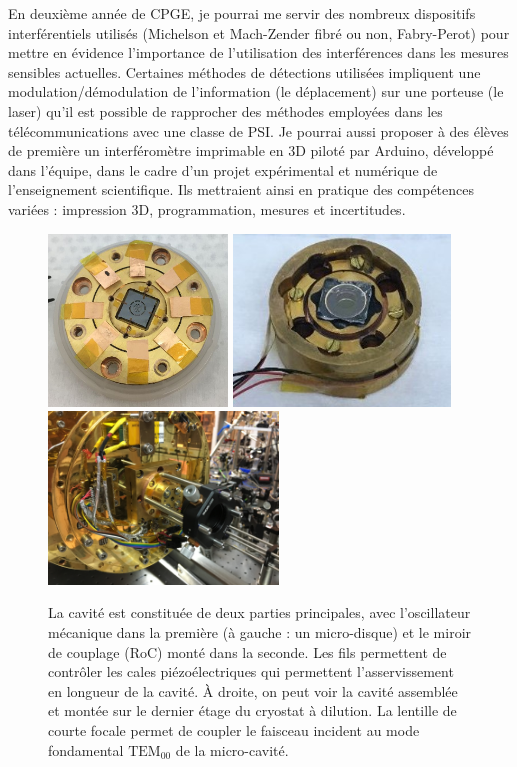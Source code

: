 \documentclass[12pt,a4paper]{article}
\newcommand{\uroc}{\micro RoC}
\newenvironment{mep}{%
\addcontentsline{ldf}{figure}{0}%
\begin{mep_env}
\small}
{\end{mep_env}}
\begin{document}
\begin{mep}
En deuxième année de CPGE, je pourrai me servir des nombreux dispositifs interférentiels utilisés (Michelson et Mach-Zender fibré ou non, Fabry-Perot) pour mettre en évidence l'importance de l'utilisation des interférences dans les mesures sensibles actuelles.
Certaines méthodes de détections utilisées impliquent une modulation/démodulation de l'information (le déplacement) sur une porteuse (le laser) qu'il est possible de rapprocher des méthodes employées dans les télécommunications avec une classe de PSI.
Je pourrai aussi proposer à des élèves de première un interféromètre imprimable en 3D piloté par Arduino, développé dans l'équipe, dans le cadre d'un projet expérimental et numérique de l'enseignement scientifique.
Ils mettraient ainsi en pratique des compétences variées : impression 3D, programmation, mesures et incertitudes.
\end{mep}

\begin{figure}
\center
\includegraphics[height=130pt]{figures/cavity_microwheel.jpg}
\includegraphics[height=130pt]{figures/cavity_uroc.jpg}
\includegraphics[height=130pt]{figures/IMG_1766.JPG}
\caption{La cavité est constituée de deux parties principales, avec l'oscillateur mécanique dans la première (à gauche : un micro-disque) et le miroir de couplage (\uroc) monté dans la seconde.
Les fils permettent de contrôler les cales piézoélectriques qui permettent l'asservissement en longueur de la cavité.
À droite, on peut voir la cavité assemblée et montée sur le dernier étage du cryostat à dilution.
La lentille de courte focale permet de coupler le faisceau incident au mode fondamental $\mathrm{TEM_{00}}$ de la micro-cavité.}
\label{fig:cavity}
\end{figure}
\end{document}
